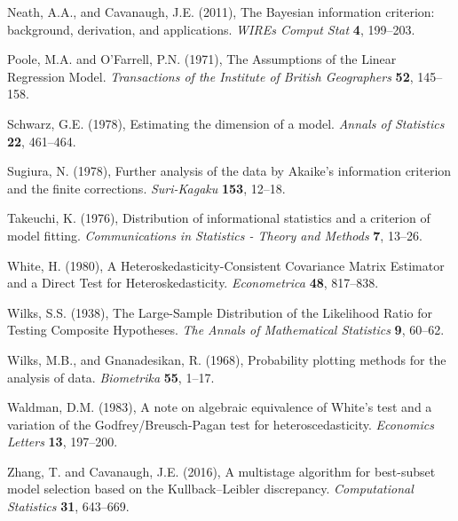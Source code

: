 \phantom{a}

\rff Neath, A.A., and Cavanaugh, J.E. (2011),
      The Bayesian information criterion: background, derivation, and applications.
      {\it WIREs Comput Stat}
      {\bf 4}, {199--203}.

\phantom{a}

\rff Poole, M.A. and O'Farrell, P.N. (1971),
      The Assumptions of the Linear Regression Model.
      {\it Transactions of the Institute of British Geographers}
      {\bf 52}, {145--158}.

\phantom{a}

\rff Schwarz, G.E. (1978),
      Estimating the dimension of a model.
      {\it Annals of Statistics}
      {\bf 22}, {461--464}.

\phantom{a}

\rff Sugiura, N. (1978),
      Further analysis of the data by Akaike's information criterion and the finite corrections.
      {\it Suri-Kagaku}
      {\bf 153}, {12--18}.

\phantom{a}

\rff Takeuchi, K. (1976),
      Distribution of informational statistics and a criterion of model fitting.
      {\it Communications in Statistics - Theory and Methods}
      {\bf 7}, {13--26}.

\phantom{a}

\rff White, H. (1980),
      A Heteroskedasticity-Consistent Covariance Matrix Estimator and a Direct Test for Heteroskedasticity.
      {\it Econometrica}
      {\bf 48}, {817--838}.

\phantom{a}

\rff Wilks, S.S. (1938),
      The Large-Sample Distribution of the Likelihood Ratio for Testing Composite Hypotheses.
      {\it The Annals of Mathematical Statistics}
      {\bf 9}, {60--62}.

\phantom{a}

\rff Wilks, M.B., and Gnanadesikan, R. (1968),
      Probability plotting methods for the analysis of data.
      {\it Biometrika}
      {\bf 55}, {1--17}.

\phantom{a}

\rff Waldman, D.M. (1983),
      A note on algebraic equivalence of White's test and a variation of the Godfrey/Breusch-Pagan test for heteroscedasticity.
      {\it Economics Letters}
      {\bf 13}, {197--200}.

\phantom{a}

\rff Zhang, T. and  Cavanaugh, J.E. (2016),
      A multistage algorithm for best-subset model selection based on the Kullback–Leibler discrepancy.
      {\it Computational Statistics}
      {\bf 31}, {643--669}.